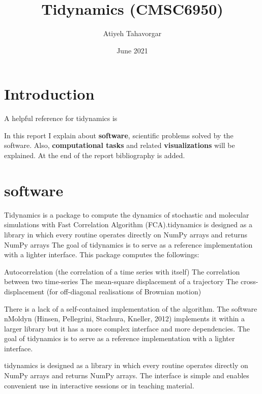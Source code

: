 \documentclass[12pt, a4paper, twoside]{report}
\title{Tidynamics (CMSC6950)}
\author{Atiyeh Tahavorgar }
\date{June 2021}
\begin{document}
\maketitle
\section{Introduction}
A helpful reference for tidynamics is \cite{tidynamics_2018}

\newpage






In this report I explain about \textbf{software}, scientific problems solved by the software. Also, \textbf{computational tasks} and related \textbf{visualizations} will be explained. At the end of the report bibliography is added. 
\newpage
\section{software}
Tidynamics is a package to compute the dynamics of stochastic and molecular simulations with Fast Correlation Algorithm (FCA).tidynamics is designed as a library in which every routine operates directly on NumPy
arrays and returns NumPy arrays The goal of tidynamics is to serve as a reference implementation with a lighter interface. This package computes the followings:


Autocorrelation (the correlation of a time series with itself) 
The correlation between two time-series
\newline The mean-square displacement of a trajectory   
\newline  The cross-displacement (for off-diagonal realisations of Brownian motion)


There is a lack of a self-contained implementation of the algorithm. The software nMoldyn (Hinsen, Pellegrini, Stachura,  Kneller, 2012) implements it within a larger library but it has a more complex interface and more dependencies. The goal of tidynamics is to serve as a reference implementation with a lighter interface. 

tidynamics is designed as a library in which every routine operates directly on NumPy
arrays and returns NumPy arrays. The interface is simple and enables convenient use in
interactive sessions or in teaching material.
\end{document}
